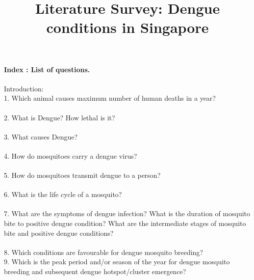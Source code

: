 \documentclass[11pt]{exam}
\begin{document}
\title{\textbf{Literature Survey: Dengue conditions in Singapore}}
\maketitle
\textbf{Index : List of questions.} \\ \\
Introduction:\\

1. Which animal causes maximum number of human deaths in a year? \\ \\
2. What is Dengue? How lethal is it? \\ \\
3. What causes Dengue?  \\ \\
4. How do mosquitoes carry a dengue virus? \\ \\
5. How do mosquitoes transmit dengue to a person? \\ \\%
6. What is the life cycle of a mosquito?  \\ \\
7. What are the symptoms of dengue infection? What is the duration of mosquito bite to positive dengue condition? What are the intermediate stages of mosquito bite and positive dengue conditions?\\ \\
8. Which conditions are favourable for dengue mosquito breeding?\\ %
9. Which is the peak period and/or season of the year for dengue mosquito breeding and subsequent dengue hotspot/cluster emergence? \\ \\%
\end{document}

